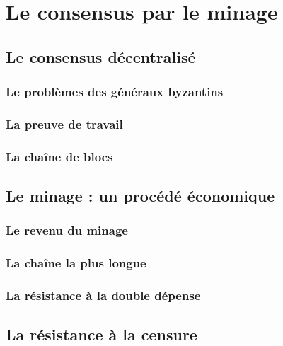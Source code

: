 \chapter{Le consensus par le minage}

\section{Le consensus décentralisé}

\subsection{Le problèmes des généraux byzantins}

\subsection{La preuve de travail}

\subsection{La chaîne de blocs}

\section{Le minage : un procédé économique}

\subsection{Le revenu du minage}

\subsection{La chaîne la plus longue}

\subsection{La résistance à la double dépense}

\section{La résistance à la censure}